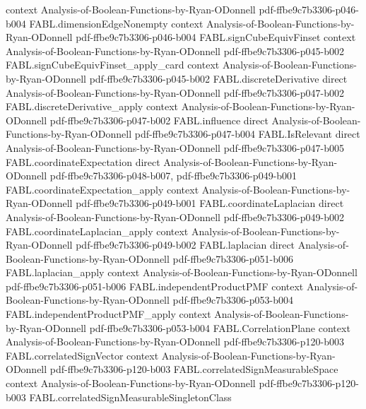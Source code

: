 \begin{theorem}
  {context}
  {Analysis-of-Boolean-Functions-by-Ryan-ODonnell}
  {pdf-ffbe9c7b3306-p046-b004}
\proofstep
  {FABL.dimensionEdgeNonempty}
  {context}
  {Analysis-of-Boolean-Functions-by-Ryan-ODonnell}
  {pdf-ffbe9c7b3306-p046-b004}
\proofstep
  {FABL.signCubeEquivFinset}
  {context}
  {Analysis-of-Boolean-Functions-by-Ryan-ODonnell}
  {pdf-ffbe9c7b3306-p045-b002}
\proofstep
  {FABL.signCubeEquivFinset_apply_card}
  {context}
  {Analysis-of-Boolean-Functions-by-Ryan-ODonnell}
  {pdf-ffbe9c7b3306-p045-b002}
\proofstep
  {FABL.discreteDerivative}
  {direct}
  {Analysis-of-Boolean-Functions-by-Ryan-ODonnell}
  {pdf-ffbe9c7b3306-p047-b002}
\proofstep
  {FABL.discreteDerivative_apply}
  {context}
  {Analysis-of-Boolean-Functions-by-Ryan-ODonnell}
  {pdf-ffbe9c7b3306-p047-b002}
\proofstep
  {FABL.influence}
  {direct}
  {Analysis-of-Boolean-Functions-by-Ryan-ODonnell}
  {pdf-ffbe9c7b3306-p047-b004}
\proofstep
  {FABL.IsRelevant}
  {direct}
  {Analysis-of-Boolean-Functions-by-Ryan-ODonnell}
  {pdf-ffbe9c7b3306-p047-b005}
\proofstep
  {FABL.coordinateExpectation}
  {direct}
  {Analysis-of-Boolean-Functions-by-Ryan-ODonnell}
  {pdf-ffbe9c7b3306-p048-b007,
    pdf-ffbe9c7b3306-p049-b001}
\proofstep
  {FABL.coordinateExpectation_apply}
  {context}
  {Analysis-of-Boolean-Functions-by-Ryan-ODonnell}
  {pdf-ffbe9c7b3306-p049-b001}
\proofstep
  {FABL.coordinateLaplacian}
  {direct}
  {Analysis-of-Boolean-Functions-by-Ryan-ODonnell}
  {pdf-ffbe9c7b3306-p049-b002}
\proofstep
  {FABL.coordinateLaplacian_apply}
  {context}
  {Analysis-of-Boolean-Functions-by-Ryan-ODonnell}
  {pdf-ffbe9c7b3306-p049-b002}
\proofstep
  {FABL.laplacian}
  {direct}
  {Analysis-of-Boolean-Functions-by-Ryan-ODonnell}
  {pdf-ffbe9c7b3306-p051-b006}
\proofstep
  {FABL.laplacian_apply}
  {context}
  {Analysis-of-Boolean-Functions-by-Ryan-ODonnell}
  {pdf-ffbe9c7b3306-p051-b006}
\proofstep
  {FABL.independentProductPMF}
  {context}
  {Analysis-of-Boolean-Functions-by-Ryan-ODonnell}
  {pdf-ffbe9c7b3306-p053-b004}
\proofstep
  {FABL.independentProductPMF_apply}
  {context}
  {Analysis-of-Boolean-Functions-by-Ryan-ODonnell}
  {pdf-ffbe9c7b3306-p053-b004}
\proofstep
  {FABL.CorrelationPlane}
  {context}
  {Analysis-of-Boolean-Functions-by-Ryan-ODonnell}
  {pdf-ffbe9c7b3306-p120-b003}
\proofstep
  {FABL.correlatedSignVector}
  {context}
  {Analysis-of-Boolean-Functions-by-Ryan-ODonnell}
  {pdf-ffbe9c7b3306-p120-b003}
\proofstep
  {FABL.correlatedSignMeasurableSpace}
  {context}
  {Analysis-of-Boolean-Functions-by-Ryan-ODonnell}
  {pdf-ffbe9c7b3306-p120-b003}
\proofstep
  {FABL.correlatedSignMeasurableSingletonClass}

\end{theorem}
